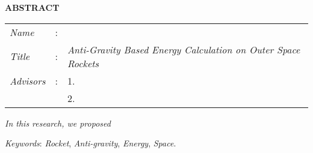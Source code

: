 \begin{center}
  \large\textbf{ABSTRACT}
\end{center}


\vspace{2ex}

\begingroup
  \setlength{\tabcolsep}{0pt}

  \noindent
  \begin{tabularx}{\textwidth}{l >{\centering}m{3em} X}
    \emph{Name}     &:& \name{} \\

    \emph{Title}    &:& \emph{Anti-Gravity Based Energy Calculation on Outer Space Rockets} \\

    \emph{Advisors} &:& 1. \advisor{} \\
                    & & 2. \coadvisor{} \\
  \end{tabularx}
\endgroup

\emph{In this research, we proposed \lipsum[1]}

\emph{Keywords}: \emph{Rocket}, \emph{Anti-gravity}, \emph{Energy}, \emph{Space}.
